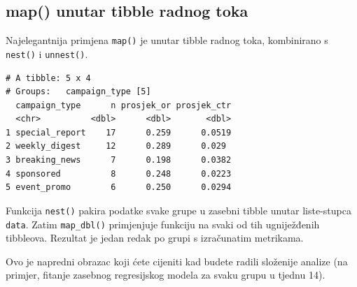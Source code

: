 \documentclass[
  croatian,
  letterpaper,
  DIV=11,
  numbers=noendperiod]{scrartcl}
\newenvironment{Shaded}{\begin{snugshade}}{\end{snugshade}}
\newcommand{\AttributeTok}[1]{\textcolor[rgb]{0.40,0.45,0.13}{#1}}
\newcommand{\DecValTok}[1]{\textcolor[rgb]{0.68,0.00,0.00}{#1}}
\newcommand{\FunctionTok}[1]{\textcolor[rgb]{0.28,0.35,0.67}{#1}}
\newcommand{\NormalTok}[1]{\textcolor[rgb]{0.00,0.23,0.31}{#1}}
\newcommand{\SpecialCharTok}[1]{\textcolor[rgb]{0.37,0.37,0.37}{#1}}
\begin{document}
\subsection{map() unutar tibble radnog
toka}\label{map-unutar-tibble-radnog-toka}

Najelegantnija primjena \texttt{map()} je unutar tibble radnog toka,
kombinirano s \texttt{nest()} i \texttt{unnest()}.

\begin{Shaded}
\end{Shaded}

\begin{verbatim}
# A tibble: 5 x 4
# Groups:   campaign_type [5]
  campaign_type      n prosjek_or prosjek_ctr
  <chr>          <dbl>      <dbl>       <dbl>
1 special_report    17      0.259      0.0519
2 weekly_digest     12      0.289      0.029 
3 breaking_news      7      0.198      0.0382
4 sponsored          8      0.248      0.0223
5 event_promo        6      0.250      0.0294
\end{verbatim}

Funkcija \texttt{nest()} pakira podatke svake grupe u zasebni tibble
unutar liste-stupca \texttt{data}. Zatim \texttt{map\_dbl()} primjenjuje
funkciju na svaki od tih ugniježđenih tibbleova. Rezultat je jedan redak
po grupi s izračunatim metrikama.

Ovo je napredni obrazac koji ćete cijeniti kad budete radili složenije
analize (na primjer, fitanje zasebnog regresijskog modela za svaku grupu
u tjednu 14).
\end{document}

